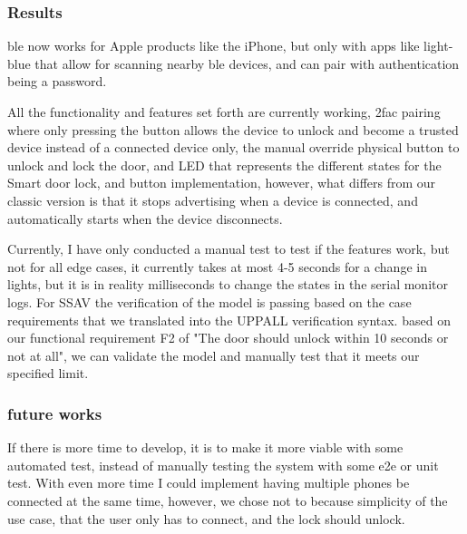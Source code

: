 \subsubsection{\textbf{Results}} 
\gls{ble} now works for Apple products like the iPhone, but only with apps like light-blue that allow for scanning nearby \gls{ble} devices, and can pair with authentication being a password.

All the functionality and features set forth are currently working, 2fac pairing where only pressing the button allows the device to unlock and become a trusted device instead of a connected device only, the manual override physical button to unlock and lock the door, and LED that represents the different states for the Smart door lock, and button implementation, however, what differs from our classic version is that it stops advertising when a device is connected, and automatically starts when the device disconnects.

Currently, I have only conducted a manual test to test if the features work, but not for all edge cases, it currently takes at most 4-5 seconds for a change in lights, but it is in reality milliseconds to change the states in the serial monitor logs. For SSAV the verification of the model is passing based on the case requirements that we translated into the UPPALL verification syntax. based on our functional requirement F2 of "The door should unlock within 10 seconds or not at all", we can validate the model and manually test that it meets our specified limit. 

\subsubsection{\textbf{future works}} 
If there is more time to develop, it is to make it more viable with some automated test, instead of manually testing the system with some e2e or unit test. With even more time I could implement having multiple phones be connected at the same time, however, we chose not to because simplicity of the use case, that the user only has to connect, and the lock should unlock.
